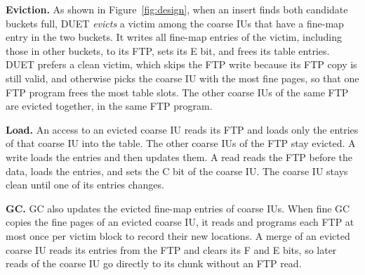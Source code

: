 \textbf{Eviction.} As shown in Figure~\ref{fig:design}, when an insert finds both
candidate buckets full, DUET \emph{evicts} a victim among the coarse IUs that have a fine-map entry in
the two buckets. It writes all fine-map entries of the victim, including those in other buckets, to its FTP,
sets its E bit, and frees its table entries. DUET prefers a clean victim, which skips the FTP write because
its FTP copy is still valid, and otherwise picks the coarse IU with the most fine pages, so that one FTP
program frees the most table slots. The other coarse IUs of the same FTP are evicted together, in the same FTP program.

\textbf{Load.} An access to an evicted coarse IU reads its FTP and loads only the
entries of that coarse IU into the table. The other
coarse IUs of the FTP stay evicted. A write loads the entries and then updates them.
A read reads the FTP before the data, loads the entries, and sets the C bit of the
coarse IU. The coarse IU stays clean until one of its entries changes.


\textbf{GC.} GC also updates the evicted fine-map entries of coarse IUs. When fine GC copies the fine pages of an
evicted coarse IU, it reads and programs each FTP at most once per victim block to record their new locations.
A merge of an evicted coarse IU reads its entries from the FTP and clears its F and E bits, so later reads of the
coarse IU go directly to its chunk without an FTP read.

